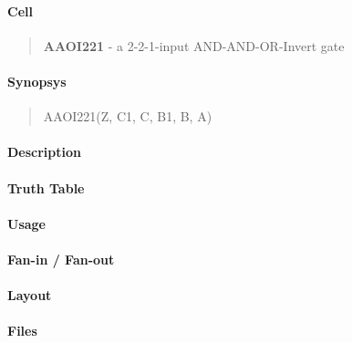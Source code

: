 \label{AAOI221}
\paragraph{Cell}
\begin{quote}
    \textbf{AAOI221} - a 2-2-1-input AND-AND-OR-Invert gate
\end{quote}

\paragraph{Synopsys}
\begin{quote}
    AAOI221(Z, C1, C, B1, B, A)
\end{quote}

\paragraph{Description}



\paragraph{Truth Table}


\paragraph{Usage}

\paragraph{Fan-in / Fan-out}

\paragraph{Layout}

\paragraph{Files}
